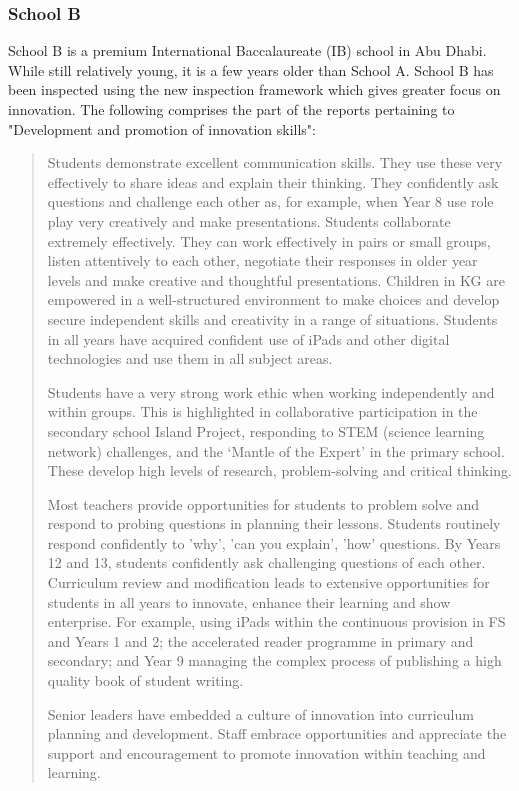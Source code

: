 \subsubsection{School B}
School B is a premium International Baccalaureate (IB) school in Abu Dhabi. While still relatively young, it is a few years older than School A. School B has been inspected using the new inspection framework which gives greater focus on innovation. The following comprises the part of the reports pertaining to "Development and promotion of innovation skills":
\begin{quote}
Students demonstrate excellent communication skills. They use these very effectively to share ideas and explain their thinking. They confidently ask questions and challenge each other as, for example, when Year 8 use role play very creatively and make presentations. Students collaborate extremely effectively. They can work effectively in pairs or small groups, listen attentively to each other, negotiate their responses in older year levels and make creative and thoughtful presentations. Children in KG are empowered in a well-structured environment to make choices and develop secure independent skills and creativity in a range of situations. Students in all years have acquired confident use of iPads and other digital technologies and use them in all subject areas.

Students have a very strong work ethic when working independently and within groups. This is highlighted in collaborative participation in the secondary school Island Project, responding to STEM (science learning network) challenges, and the ‘Mantle of the Expert’ in the primary school. These develop high levels of research, problem-solving and critical thinking.

Most teachers provide opportunities for students to problem solve and respond to probing questions in planning their lessons. Students routinely respond confidently to 'why', 'can you explain', 'how' questions. By Years 12 and 13, students confidently ask challenging questions of each other.
Curriculum review and modification leads to extensive opportunities for students in all years to innovate, enhance their learning and show enterprise. For example, using iPads within the continuous provision in FS and Years 1 and 2; the accelerated reader programme in primary and secondary; and Year 9 managing the complex process of publishing a high quality book of student writing.

Senior leaders have embedded a culture of innovation into curriculum planning and development. Staff embrace opportunities and appreciate the support and encouragement to promote innovation within teaching and learning.
\end{quote}

